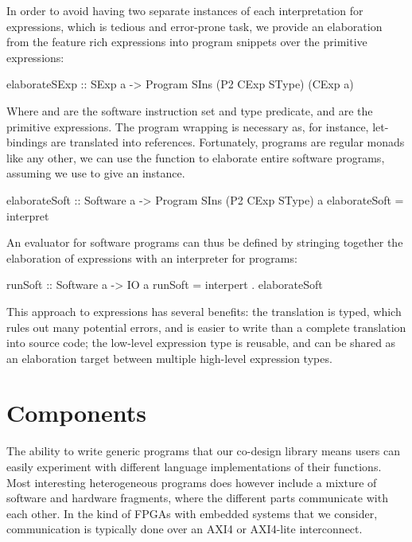\documentclass[../paper.tex]{subfiles}
\begin{document}
In order to avoid having two separate instances of each interpretation for expressions, which is tedious and error-prone task, we provide an elaboration from the feature rich expressions into program snippets over the primitive expressions:

\begin{code}
elaborateSExp :: SExp a -> Program SIns (P2 CExp SType) (CExp a)
\end{code}

\noindent Where  and  are the software instruction set and type predicate, and  are the primitive expressions. The program wrapping is necessary as, for instance, let-bindings are translated into references. Fortunately, programs are regular monads like any other, we can use the  function to elaborate entire software programs, assuming we use  to give an  instance.

\begin{code}
elaborateSoft :: Software a -> Program SIns (P2 CExp SType) a
elaborateSoft = interpret
\end{code}

An evaluator for software programs can thus be defined by stringing together the elaboration of expressions with an interpreter for programs:

\begin{code}
runSoft :: Software a -> IO a
runSoft = interpert . elaborateSoft
\end{code}

This approach to expressions has several benefits: the translation is typed, which rules out many potential errors, and is easier to write than a complete translation into source code; the low-level expression type is reusable, and can be shared as an elaboration target between multiple high-level expression types.

\section{Components}

The ability to write generic programs that our co-design library means users can easily experiment with different language implementations of their functions. Most interesting heterogeneous programs does however include a mixture of software and hardware fragments, where the different parts communicate with each other. In the kind of FPGAs with embedded systems that we consider, communication is typically done over an AXI4 or AXI4-lite interconnect. 
\end{document}
